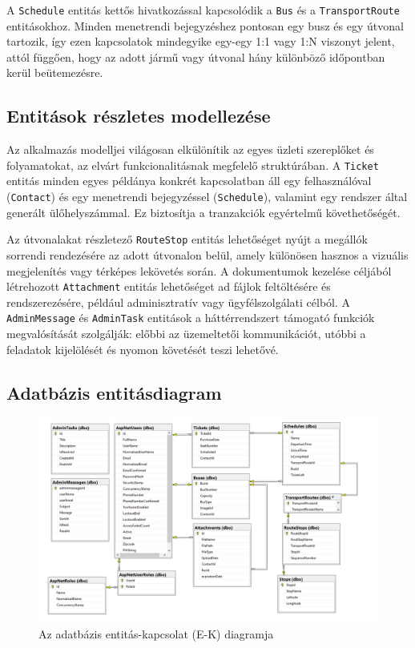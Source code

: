 A \texttt{Schedule} entitás kettős hivatkozással kapcsolódik a \texttt{Bus} és a \texttt{TransportRoute} entitásokhoz. Minden menetrendi bejegyzéshez pontosan egy busz és egy útvonal tartozik, így ezen kapcsolatok mindegyike egy-egy 1:1 vagy 1:N viszonyt jelent, attól függően, hogy az adott jármű vagy útvonal hány különböző időpontban kerül beütemezésre.

\subsection{Entitások részletes modellezése}

Az alkalmazás modelljei világosan elkülönítik az egyes üzleti szereplőket és folyamatokat, az elvárt funkcionalitásnak megfelelő struktúrában. A \texttt{Ticket} entitás minden egyes példánya konkrét kapcsolatban áll egy felhasználóval (\texttt{Contact}) és egy menetrendi bejegyzéssel (\texttt{Schedule}), valamint egy rendszer által generált ülőhelyszámmal. Ez biztosítja a tranzakciók egyértelmű követhetőségét.

Az útvonalakat részletező \texttt{RouteStop} entitás lehetőséget nyújt a megállók sorrendi rendezésére az adott útvonalon belül, amely különösen hasznos a vizuális megjelenítés vagy térképes lekövetés során. A dokumentumok kezelése céljából létrehozott \texttt{Attachment} entitás lehetőséget ad fájlok feltöltésére és rendszerezésére, például adminisztratív vagy ügyfélszolgálati célból. A \texttt{AdminMessage} és \texttt{AdminTask} entitások a háttérrendszert támogató funkciók megvalósítását szolgálják: előbbi az üzemeltetői kommunikációt, utóbbi a feladatok kijelölését és nyomon követését teszi lehetővé.

\subsection{Adatbázis entitásdiagram}

\begin{figure}[H]
    \centering
    \includegraphics[width=1\textwidth]{Szakdolgozat/Mellekletek/ERfinal.PNG}
    

    \caption{Az adatbázis entitás-kapcsolat (E-K) diagramja}
    \label{fig:er-diagram}
\end{figure}

